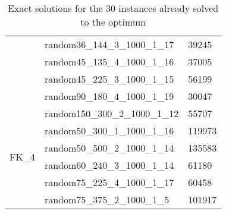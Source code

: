 \begin{table}[!htbp]
{\begin{tabular}{@{}lll@{}}
            & random36\_144\_3\_1000\_1\_17              & 39245  \\
            & random45\_135\_4\_1000\_1\_16              & 37005  \\
            & random45\_225\_3\_1000\_1\_15              & 56199  \\
            & random90\_180\_4\_1000\_1\_19              & 30047  \\ \midrule
            \multirow{6}{*}{FK\_4} 
            & random150\_300\_2\_1000\_1\_12             & 55707  \\
            & random50\_300\_1\_1000\_1\_16              & 119973 \\
            & random50\_500\_2\_1000\_1\_14              & 135583 \\
            & random60\_240\_3\_1000\_1\_14              & 61180  \\
            & random75\_225\_4\_1000\_1\_17              & 60458  \\
            & random75\_375\_2\_1000\_1\_5               & 101917 \\ \bottomrule
        \end{tabular}
    }
    \caption{Exact solutions for the 30 instances already solved to the optimum}
    \label{tab:exact_opt}
\end{table}
